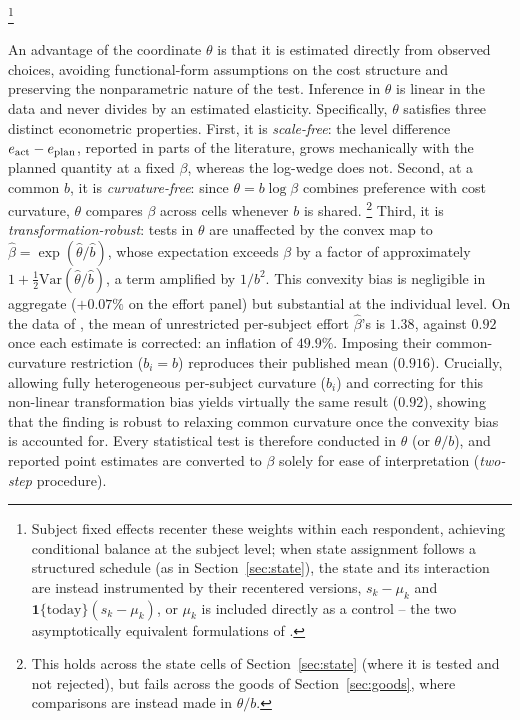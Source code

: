 \documentclass[11pt,a4paper]{article}
\theoremstyle{plain}
\theoremstyle{definition}
\newcommand{\Var}{\mathrm{Var}}
\begin{document}
\footnote{%
Subject fixed effects recenter these weights within each respondent, achieving conditional balance at the subject level; when state assignment follows a structured schedule (as in Section~\ref{sec:state}), the state and its interaction are instead instrumented by their recentered versions, $s_k - \mu_k$ and $\mathbf{1}\{\text{today}\}(s_k - \mu_k)$, or $\mu_k$ is included directly as a control -- the two asymptotically equivalent formulations of \citet{borusyak2023}.} 



\noindent
An advantage of the coordinate $\theta$ is that it is estimated directly from observed choices, 
avoiding functional-form assumptions on the cost structure and preserving the nonparametric nature of the test.
Inference in $\theta$ is linear in the data and never divides by an estimated elasticity.
Specifically, $\theta$ satisfies three distinct econometric properties.
First, it is \emph{scale-free}: the level difference $e_{\rm act} - e_{\rm plan}$, reported in parts of the literature, grows mechanically with the planned quantity at a fixed $\beta$, whereas the log-wedge does not.
Second, at a common $b$, it is \emph{curvature-free}: since $\theta = b \log \beta$ combines preference with cost curvature, $\theta$ compares $\beta$ across cells whenever $b$ is shared.%
\footnote{This holds across the state cells of Section~\ref{sec:state} (where it is tested and not rejected), but fails across the goods of Section~\ref{sec:goods}, where comparisons are instead made in $\theta / b$.} 
Third, it is \emph{transformation-robust}: tests in $\theta$ are unaffected by the convex map to $\hat\beta=\exp(\hat\theta/\hat b)$, whose expectation exceeds $\beta$ by a factor of approximately $1+\tfrac12\Var(\hat\theta/\hat b)$, a term amplified by $1/b^{2}$. This convexity bias is negligible in aggregate ($+0.07\%$ on the effort panel) but substantial at the individual level. On the data of \citet{ans2015}, the mean of unrestricted per-subject effort $\hat\beta$'s is $1.38$, against $0.92$ once each estimate is corrected: an inflation of $49.9\%$. Imposing their common-curvature restriction ($b_i=b$) reproduces their published mean ($0.916$). %
Crucially, allowing fully heterogeneous per-subject curvature ($b_i$) and correcting for this non-linear transformation bias yields virtually the same result ($0.92$), showing that the finding is robust to relaxing common curvature once the convexity bias is accounted for.
Every statistical test is therefore conducted in $\theta$ (or $\theta/b$), and reported point estimates are converted to $\beta$ solely for ease of interpretation (\textit{two-step} procedure).
\end{document}
